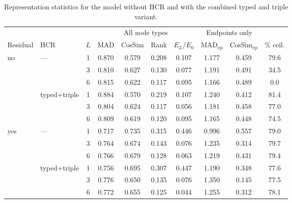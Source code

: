 %
%

\begin{table}[htbp]
  \centering
  \footnotesize
  \setlength{\tabcolsep}{4pt}
  \caption{Representation statistics for the model without HCR and with
    the combined typed and triple variant.}
  \label{tab:oversmoothing-summary}
  \begin{tabular}{llcccccccc}
    \toprule
    & & & \multicolumn{4}{c}{All node types} & \multicolumn{2}{c}{Endpoints only} & \\
    \cmidrule(lr){4-7}\cmidrule(lr){8-9}
    Residual & HCR & $L$ & MAD & CosSim & Rank & $E_L/E_0$ & MAD$_{\mathrm{ep}}$ & CosSim$_{\mathrm{ep}}$ & \% ceil. \\
    \midrule
    \multirow{6}{*}{no}
      & \multirow{3}{*}{---}
                       & 1 & 0.870 & 0.579 & 0.208 & 0.107 & 1.177 & 0.459 & 79.6 \\
    & & 3 & 0.810 & 0.627 & 0.130 & 0.077 & 1.191 & 0.491 & 34.5 \\
    & & 6 & 0.815 & 0.622 & 0.117 & 0.095 & 1.166 & 0.489 &  0.0 \\
    \cmidrule(lr){2-10}
      & \multirow{3}{*}{typed+triple}
                       & 1 & 0.884 & 0.570 & 0.219 & 0.107 & 1.240 & 0.412 & 81.4 \\
    & & 3 & 0.804 & 0.624 & 0.117 & 0.056 & 1.181 & 0.458 & 77.0 \\
    & & 6 & 0.809 & 0.619 & 0.120 & 0.095 & 1.165 & 0.448 & 74.5 \\
    \midrule
    \multirow{6}{*}{yes}
      & \multirow{3}{*}{---}
                       & 1 & 0.717 & 0.735 & 0.315 & 0.446 & 0.996 & 0.557 & 79.0 \\
    & & 3 & 0.764 & 0.674 & 0.143 & 0.076 & 1.235 & 0.314 & 79.7 \\
    & & 6 & 0.766 & 0.679 & 0.128 & 0.063 & 1.219 & 0.431 & 79.4 \\
    \cmidrule(lr){2-10}
      & \multirow{3}{*}{typed+triple}
                       & 1 & 0.756 & 0.695 & 0.307 & 0.447 & 1.190 & 0.348 & 77.6 \\
    & & 3 & 0.776 & 0.650 & 0.135 & 0.076 & 1.350 & 0.145 & 77.5 \\
    & & 6 & 0.772 & 0.655 & 0.125 & 0.044 & 1.255 & 0.312 & 78.1 \\
    \bottomrule
  \end{tabular}
\end{table}
